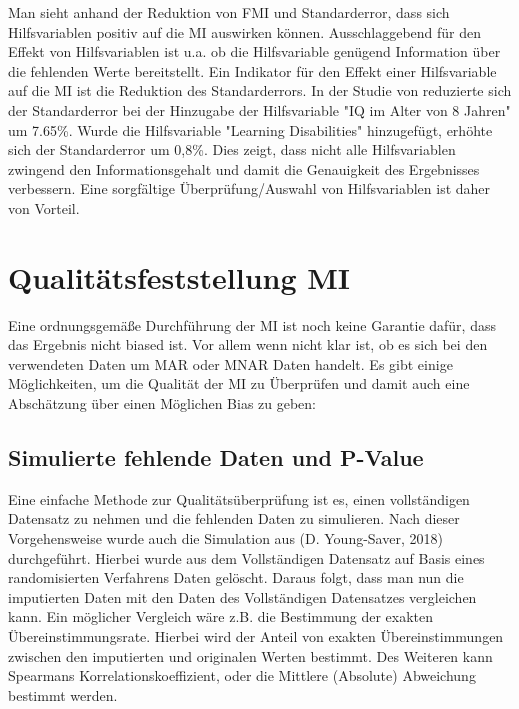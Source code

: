 Man sieht anhand der Reduktion von FMI und Standarderror, dass sich Hilfsvariablen positiv auf die MI auswirken können. Ausschlaggebend für den Effekt von Hilfsvariablen
ist u.a. ob die Hilfsvariable genügend Information über die fehlenden Werte bereitstellt. \autocite[1302]{Hughes2019} Ein Indikator für den Effekt einer Hilfsvariable auf 
die MI ist die Reduktion des Standarderrors. In der Studie von \textcite[]{Madley-Dowd2019} reduzierte sich der Standarderror bei der Hinzugabe der Hilfsvariable 
"IQ im Alter von 8 Jahren" um 7.65\%. Wurde die Hilfsvariable "Learning Disabilities" hinzugefügt, erhöhte sich der Standarderror um 0,8\%. \autocite[71]{Madley-Dowd2019} 
Dies zeigt, dass nicht alle Hilfsvariablen zwingend den Informationsgehalt und damit die Genauigkeit des Ergebnisses verbessern. 
Eine sorgfältige Überprüfung/Auswahl von Hilfsvariablen ist daher von Vorteil. 


\section{Qualitätsfeststellung MI}
\label{section:qualtity}

Eine ordnungsgemäße Durchführung der MI ist noch keine Garantie dafür, 
dass das Ergebnis nicht biased ist. Vor allem wenn nicht klar ist, ob es sich bei den verwendeten Daten um MAR oder MNAR 
Daten handelt. Es gibt einige Möglichkeiten, um die Qualität der MI zu Überprüfen und damit auch eine Abschätzung über einen 
Möglichen Bias zu geben:

\subsection{Simulierte fehlende Daten und P-Value}

Eine einfache Methode zur Qualitätsüberprüfung ist es, einen vollständigen Datensatz zu nehmen und die fehlenden Daten zu 
simulieren. Nach dieser Vorgehensweise wurde auch die Simulation aus (D. Young-Saver, 2018) durchgeführt. Hierbei wurde 
aus dem Vollständigen Datensatz auf Basis eines randomisierten Verfahrens Daten gelöscht. Daraus folgt, dass man nun die 
imputierten Daten mit den Daten des Vollständigen Datensatzes vergleichen kann. Ein möglicher Vergleich wäre z.B. die 
Bestimmung der exakten Übereinstimmungsrate. Hierbei wird der Anteil von exakten Übereinstimmungen zwischen den imputierten 
und originalen Werten bestimmt. Des Weiteren kann Spearmans Korrelationskoeffizient, oder die Mittlere (Absolute) Abweichung 
bestimmt werden. \autocite[3664]{Young-Saver2018} 

